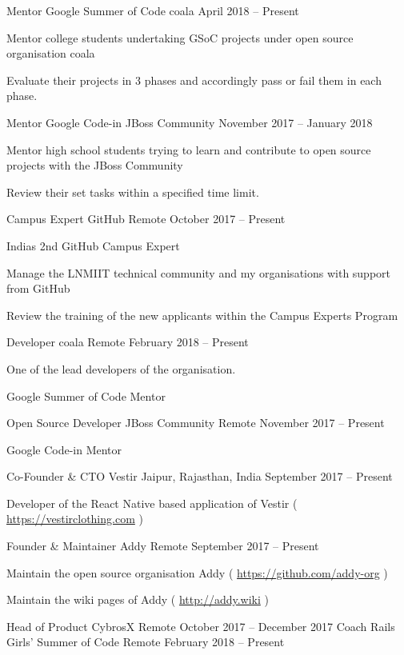 \begin{cventries}
	\cventry
	{Mentor}
	{Google Summer of Code}
	{coala}
	{April 2018 – Present}
	{\begin{cvitems}
		\item {Mentor college students undertaking GSoC projects under open source organisation coala}
		\item {Evaluate their projects in 3 phases and accordingly pass or fail them in each phase.}
		\end{cvitems}}
	\cventry
	{Mentor}
	{Google Code-in}
	{JBoss Community}
	{November 2017 – January 2018}
	{\begin{cvitems}
		\item {Mentor high school students trying to learn and contribute to open source projects with the JBoss Community}
		\item {Review their set tasks within a specified time limit.}
		\end{cvitems}}
	\cventry
	{Campus Expert}
	{GitHub}
	{Remote}
	{October 2017 – Present}
	{\begin{cvitems}
		\item {India\textquotesingle{}s 2nd GitHub Campus Expert}
		\item {Manage the LNMIIT technical community and my organisations with support from GitHub}
		\item {Review the training of the new applicants within the Campus Experts Program}
		\end{cvitems}}
	\cventry
	{Developer}
	{coala}
	{Remote}
	{February 2018 – Present}
	{\begin{cvitems}
		\item {One of the lead developers of the organisation.}
		\item {Google Summer of Code Mentor}
		\end{cvitems}}
	\cventry
	{Open Source Developer}
	{JBoss Community}
	{Remote}
	{November 2017 – Present}
	{\begin{cvitems}
    {Google Code-in Mentor}
    \end{cvitems}}
    \cventry
	{Co-Founder \& CTO}
	{Vestir}
	{Jaipur, Rajasthan, India}
	{September 2017 – Present}
    {\begin{cvitems}
    {Developer of the React Native based application of Vestir ( \url{https://vestirclothing.com} )}
    \end{cvitems}}
	\cventry
	{Founder \& Maintainer}
	{Addy}
	{Remote}
	{September 2017 – Present}
	{\begin{cvitems}
		\item {Maintain the open source organisation Addy ( \url{https://github.com/addy-org} )}
		\item {Maintain the wiki pages of Addy ( \url{http://addy.wiki} )}
		\end{cvitems}}
	\cventry
	{Head of Product}
	{CybrosX}
	{Remote}
	{October 2017 – December 2017}
	{}
	\cventry
	{Coach}
	{Rails Girls' Summer of Code}
	{Remote}
	{February 2018 – Present}
	{}
\end{cventries}
